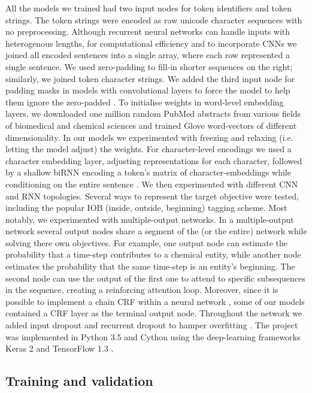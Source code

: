 \documentclass[twocolumn]{bmcart}%
\begin{document}
All the models we trained had two input nodes for token identifiers and token strings. 
The token strings were encoded as raw unicode character sequences with no preprocessing. 
Although recurrent neural networks can handle inputs with heterogenous lengths, for computational efficiency and to incorporate CNNs we joined all encoded sentences into a single array, where each row represented a single sentence.
We used zero-padding to fill-in shorter sequences on the right; similarly, we joined token character strings.
We added the third input node for padding masks in models with convolutional layers to force the model to help them ignore the zero-padded .
To initialise weights in word-level embedding layers, we downloaded one million random PubMed abstracts from various fields of biomedical and chemical sciences and trained Glove word-vectors \cite{Pennington2014} of different dimensionality.
In our models we experimented with freezing and relaxing (i.e. letting the model adjust) the weights.
For character-level encodings we used a character embedding layer, adjusting representations for each character, followed by a shallow biRNN encoding a token's matrix of character-embeddings while conditioning on the entire sentence \cite{Ling2015}.
We then experimented with different CNN and RNN topologies.
Several ways to represent the target objective were tested, including the popular IOB (inside, outside, beginning) tagging scheme.
Most notably, we experimented with multiple-output networks.
In a multiple-output network several output nodes share a segment of the (or the entire) network while solving there own objectives.
For example, one output node can estimate the probability that a time-step contributes to a chemical entity, while another node estimates the probability that the same time-step is an entity’s beginning. 
The second node can use the output of the first one to attend to specific subsequences in the sequence, creating a reinforcing attention loop.
Moreover, since it is possible to implement a chain CRF within a neural network \cite{Huang2015}, some of our models contained a CRF layer as the terminal output node.
Throughout the network we added input dropout and recurrent dropout to hamper overfitting \cite{Gal2015}.
The project was implemented in Python 3.5 and Cython using the deep-learning frameworks Keras 2 \cite{chollet2015keras} and TensorFlow 1.3 \cite{tensorflow2015-whitepaper}. 

\subsection*{Training and validation}
\end{document}
